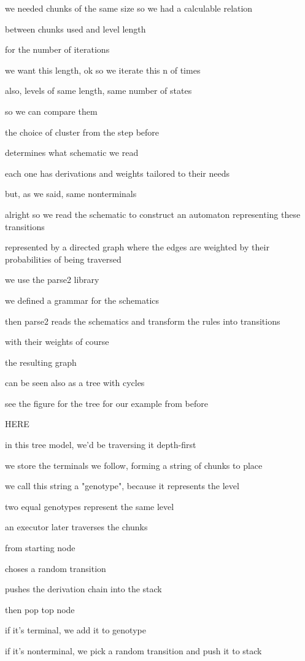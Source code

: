 \documentclass[conference]{IEEEtran}
\begin{document}
we needed chunks of the same size so we had a calculable relation

between chunks used and level length

for the number of iterations

we want this length, ok so we iterate this n of times

also, levels of same length, same number of states

so we can compare them

the choice of cluster from the step before

determines what schematic we read

each one has derivations and weights tailored to their needs

but, as we said, same nonterminals

alright so we read the schematic to construct an automaton representing these transitions

represented by a directed graph where the edges are weighted by their probabilities of being traversed

we use the parse2 library

we defined a grammar for the schematics

then parse2 reads the schematics and transform the rules into transitions

with their weights of course

the resulting graph

can be seen also as a tree with cycles

see the figure for the tree for our example from before

HERE

in this tree model, we'd be traversing it depth-first

we store the terminals we follow, forming a string of chunks to place

we call this string a "genotype", because it represents the level

two equal genotypes represent the same level

an executor later traverses the chunks

from starting node

choses a random transition

pushes the derivation chain into the stack

then pop top node

if it's terminal, we add it to genotype

if it's nonterminal, we pick a random transition and push it to stack
\end{document}

